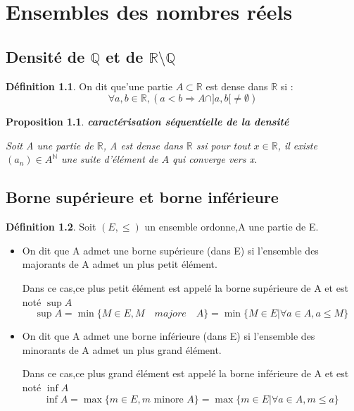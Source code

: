\documentclass[12pt]{book}
\theoremstyle{definition}\newtheorem{dfn}{Définition}[chapter]
\theoremstyle{plain}\newtheorem{thm}{Théorème}[chapter]
\theoremstyle{plain}\newtheorem{prp}{Proposition}[chapter]
\theoremstyle{plain}\newtheorem{lem}{\bf Lemme}[chapter]
\theoremstyle{plain}\newtheorem{axm}{\bf Axiome}[chapter]
\theoremstyle{plain}\newtheorem{lmm}{\bf Lemme}[chapter]
\theoremstyle{plain}\newtheorem{cor}{\bf Corollaire}[chapter]
\theoremstyle{remark}\newtheorem{rem}{Remarque}[chapter]
\begin{document}
\chapter{Ensembles des nombres réels}
\section{Densité de $\mathbb{Q}$ et de $\mathbb{R\setminus Q}$}
\begin{dfn}
        On dit que'une partie $A\subset \mathbb{R}$ est dense dans $\mathbb{R}$ si :
        $$
        \forall a,b\in \mathbb{R},
        (a<b \Rightarrow A\cap ] a,b [\not=\emptyset )
        $$

\end{dfn}

\begin{prp}{\textbf{caractérisation séquentielle de la densité}}

        Soit A une partie de $\mathbb{R}$, A est dense dans $\mathbb{R}$ ssi pour
        tout $x \in \mathbb{R}$, il existe $(a_n)\in A^{\mathbb{N}}$ une suite d'élément de $A$ qui converge vers x.
\end{prp}

\section{Borne supérieure et borne inférieure}
\begin{dfn}
Soit $(E,\le)$ un ensemble ordonne,A une partie de E.
\begin{itemize}
        \item On dit que A admet une borne supérieure (dans E) si l'ensemble des majorants de A admet un plus petit élément.

        Dans ce cas,ce plus petit élément est appelé la borne supérieure de A et
        est noté $\sup A$
        $$
        \sup A=\min\{M\in E, M \quad majore\quad A\}=\min\{ M\in E  | \forall a\in A ,a\le M\}
        $$

        \item On dit que A admet une borne inférieure (dans E) si l'ensemble des minorants de A admet un plus grand élément.

        Dans ce cas,ce plus grand élément est appelé la borne inférieure de A et
        est noté $\inf A$
                $$
        \inf A=\max\{m\in E, m\text{ minore }A\}=\max\{ m\in E  | \forall a\in A ,m\le a\}
        $$


\end{itemize}
\end{dfn}
\end{document}
